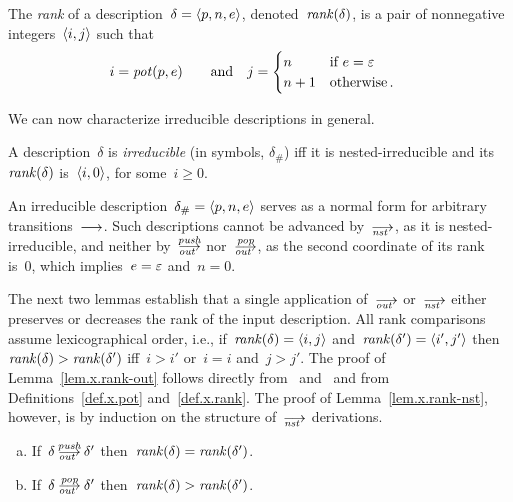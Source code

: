 \begin{definition}
  \label{def.x.rank}
  The \emph{rank} of a description~$\delta=\<p,n,e>$,
  denoted~$\operatorname{\mathit{rank}}(\delta)$, is a pair of nonnegative integers~$\<i,j>$ such
  that
  \begin{alignat*}{2}
    i&=\operatorname{\mathit{pot}}(p,e) &\quad\text{and}\quad
    j&=
       \begin{cases}
         n  &\text{if~$e=\varepsilon$}\\
         n+1&\text{otherwise\,.}
       \end{cases}
  \end{alignat*}
\end{definition}

We can now characterize irreducible descriptions in general.

\begin{definition}
  \label{def.x.H}
  A description~$\delta$ is \emph{irreducible} (in symbols, $\delta_\#$) iff
  it is nested-irreducible and its~$\operatorname{\mathit{rank}}(\delta)$ is~$\<i,0>$, for
  some~$i\ge0$.
\end{definition}

An irreducible description~$\delta_\#=\<p,n,e>$ serves as a normal form for
arbitrary transitions~$\trans$.  Such descriptions cannot be advanced
by~$\nst$, as it is nested-irreducible, and neither by~$\outpush$
nor~$\outpop$, as the second coordinate of its rank is~0, which
implies~$e=\varepsilon$ and~$n=0$.

The next two lemmas establish that a single application of~$\out$ or~$\nst$
either preserves or decreases the rank of the input description.  All rank
comparisons assume lexicographical order, i.e., if~$\rank(\delta)=\<i,j>$
and~$\rank(\delta')=\<i',j'>$ then~$\operatorname{\mathit{rank}}(\delta)>\operatorname{\mathit{rank}}(\delta')$ iff~$i>i'$
or~$i=i$ and~$j>j'$.
The proof of Lemma~\ref{lem.x.rank-out} follows directly from~
and~ and from Definitions~\ref{def.x.pot} and~\ref{def.x.rank}.  The
proof of Lemma~\ref{lem.x.rank-nst}, however, is by induction on the
structure of~$\nst$ derivations.

\begin{lemma}\strut
  \label{lem.x.rank-out}
  \begin{enumerate}[(a)]
  \item\label{lem.rank-out-push} If~$\delta\outpush\delta'$
    then~$\operatorname{\mathit{rank}}(\delta)=\operatorname{\mathit{rank}}(\delta')$.
  \item\label{lem.rank-out-pop} If~$\delta\outpop\delta'$
    then~$\operatorname{\mathit{rank}}(\delta)>\operatorname{\mathit{rank}}(\delta')$.
  \end{enumerate}
\end{lemma}

